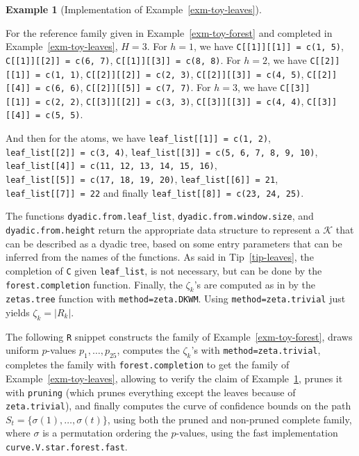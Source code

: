 \documentclass[
  11pt,
  a4paper,
]{article}
\theoremstyle{definition}
\newtheorem{example}{Example}[section]
\theoremstyle{plain}
\theoremstyle{plain}
\theoremstyle{plain}
\theoremstyle{definition}
\theoremstyle{remark}
\begin{document}
\begin{example}[Implementation of
Example~\ref{exm-toy-leaves}]\protect\hypertarget{exm-implementation}{}\label{exm-implementation}

For the reference family given in Example~\ref{exm-toy-forest} and
completed in Example~\ref{exm-toy-leaves}, \(H=3\). For \(h=1\), we have
\texttt{C{[}{[}1{]}{]}{[}{[}1{]}{]}\ =\ c(1,\ 5)},
\texttt{C{[}{[}1{]}{]}{[}{[}2{]}{]}\ =\ c(6,\ 7)},
\texttt{C{[}{[}1{]}{]}{[}{[}3{]}{]}\ =\ c(8,\ 8)}. For \(h=2\), we have
\texttt{C{[}{[}2{]}{]}{[}{[}1{]}{]}\ =\ c(1,\ 1)},
\texttt{C{[}{[}2{]}{]}{[}{[}2{]}{]}\ =\ c(2,\ 3)},
\texttt{C{[}{[}2{]}{]}{[}{[}3{]}{]}\ =\ c(4,\ 5)},
\texttt{C{[}{[}2{]}{]}{[}{[}4{]}{]}\ =\ c(6,\ 6)},
\texttt{C{[}{[}2{]}{]}{[}{[}5{]}{]}\ =\ c(7,\ 7)}. For \(h=3\), we have
\texttt{C{[}{[}3{]}{]}{[}{[}1{]}{]}\ =\ c(2,\ 2)},
\texttt{C{[}{[}3{]}{]}{[}{[}2{]}{]}\ =\ c(3,\ 3)},
\texttt{C{[}{[}3{]}{]}{[}{[}3{]}{]}\ =\ c(4,\ 4)},
\texttt{C{[}{[}3{]}{]}{[}{[}4{]}{]}\ =\ c(5,\ 5)}.

And then for the atoms, we have
\texttt{leaf\_list{[}{[}1{]}{]}\ =\ c(1,\ 2)},
\texttt{leaf\_list{[}{[}2{]}{]}\ =\ c(3,\ 4)},
\texttt{leaf\_list{[}{[}3{]}{]}\ =\ c(5,\ 6,\ 7,\ 8,\ 9,\ 10)},
\texttt{leaf\_list{[}{[}4{]}{]}\ =\ c(11,\ 12,\ 13,\ 14,\ 15,\ 16)},
\texttt{leaf\_list{[}{[}5{]}{]}\ =\ c(17,\ 18,\ 19,\ 20)},
\texttt{leaf\_list{[}{[}6{]}{]}\ =\ 21},
\texttt{leaf\_list{[}{[}7{]}{]}\ =\ 22} and finally
\texttt{leaf\_list{[}{[}8{]}{]}\ =\ c(23,\ 24,\ 25)}.

\end{example}

The functions \texttt{dyadic.from.leaf\_list},
\texttt{dyadic.from.window.size}, and \texttt{dyadic.from.height} return
the appropriate data structure to represent a \(\mathcal{K}\) that can
be described as a dyadic tree, based on some entry parameters that can
be inferred from the names of the functions. As said in
Tip~\ref{tip-leaves}, the completion of \texttt{C} given
\texttt{leaf\_list}, is not necessary, but can be done by the
\texttt{forest.completion} function. Finally, the \(\zeta_k\)'s are
computed as in \citet{MR4178188} by the \texttt{zetas.tree} function
with \texttt{method=zeta.DKWM}. Using \texttt{method=zeta.trivial} just
yields \(\zeta_k=|R_k|\).

The following \texttt{R} snippet constructs the family of
Example~\ref{exm-toy-forest}, draws uniform \(p\)-values
\(p_1,\dotsc,p_{25}\), computes the \(\zeta_k\)'s with
\texttt{method=zeta.trivial}, completes the family with
\texttt{forest.completion} to get the family of
Example~\ref{exm-toy-leaves}, allowing to verify the claim of
Example~\ref{exm-implementation}, prunes it with \texttt{pruning} (which
prunes everything except the leaves because of \texttt{zeta.trivial}),
and finally computes the curve of confidence bounds on the path
\(S_t=\{\sigma(1),\dots,\sigma(t)\}\), using both the pruned and
non-pruned complete family, where \(\sigma\) is a permutation ordering
the \(p\)-values, using the fast implementation
\texttt{curve.V.star.forest.fast}.
\end{document}
